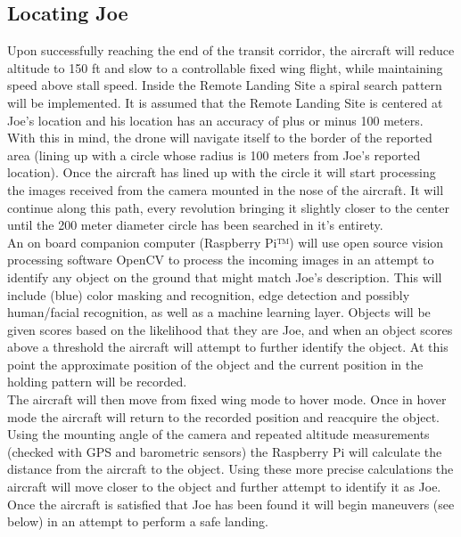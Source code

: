 \subsection{Locating Joe}
Upon successfully reaching the end of the transit corridor, the aircraft will reduce altitude to 150 ft and slow to a controllable fixed wing flight, while maintaining speed above stall speed. Inside the Remote Landing Site a spiral search pattern will be implemented. It is assumed that the Remote Landing Site is centered at Joe's location and his location has an accuracy of plus or minus 100 meters.\\

With this in mind, the drone will navigate itself to the border of the reported area (lining up with a circle whose radius is 100 meters from Joe’s reported location). Once the aircraft has lined up with the circle it will start processing the images received from the camera mounted in the nose of the aircraft. It will continue along this path, every revolution bringing it slightly closer to the center until the 200 meter diameter circle has been searched in it’s entirety.\\

An on board companion computer (Raspberry Pi™) will use open source vision processing software OpenCV to process the incoming images in an attempt to identify any object on the ground that might match Joe's description. This will include (blue) color masking and recognition, edge detection and possibly human/facial recognition, as well as a machine learning layer. Objects will be given scores based on the likelihood that they are Joe, and when an object scores above a threshold the aircraft will attempt to further identify the object. At this point the approximate position of the object and the current position in the holding pattern will be recorded.\\

The aircraft will then move from fixed wing mode to hover mode. Once in hover mode the aircraft will return to the recorded position and reacquire the object. Using the mounting angle of the camera and repeated altitude measurements (checked with GPS and barometric sensors) the Raspberry Pi will calculate the distance from the aircraft to the object. Using these more precise calculations the aircraft will move closer to the object and further attempt to identify it as Joe. Once the aircraft is satisfied that Joe has been found it will begin maneuvers (see below) in an attempt to perform a safe landing.\\

